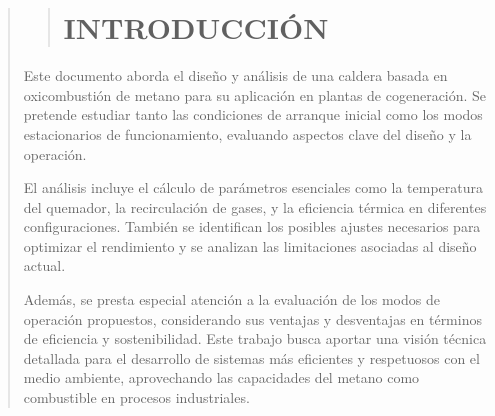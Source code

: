 \documentclass[11pt, a4paper]{article}
\begin{document}
\begin{quote}
\begin{center}
\begin{adjustwidth}{-1.7cm}{-1cm}
\newpage
\tableofcontents


\newpage
\vspace*{0.05cm}
\listoffigures


\newpage
\vspace*{0.05cm}
\listoftables

\newpage

\begin{quote}
\setlength{\parskip}{1pt} %
\vspace*{0.3cm} %
\hypertarget{introducciuxf3n}{%
\section{INTRODUCCIÓN}\label{introducciuxf3n}}
\end{quote}
\vspace*{1cm} %


Este documento aborda el diseño y análisis de una caldera basada en oxicombustión de metano para su aplicación en plantas de cogeneración. Se pretende estudiar tanto las condiciones de arranque inicial como los modos estacionarios de funcionamiento, evaluando aspectos clave del diseño y la operación.

El análisis incluye el cálculo de parámetros esenciales como la temperatura del quemador, la recirculación de gases, y la eficiencia térmica en diferentes configuraciones. También se identifican los posibles ajustes necesarios para optimizar el rendimiento y se analizan las limitaciones asociadas al diseño actual.

Además, se presta especial atención a la evaluación de los modos de operación propuestos, considerando sus ventajas y desventajas en términos de eficiencia y sostenibilidad. Este trabajo busca aportar una visión técnica detallada para el desarrollo de sistemas más eficientes y respetuosos con el medio ambiente, aprovechando las capacidades del metano como combustible en procesos industriales.


\vspace*{1cm}


\end{adjustwidth}
\end{center}
\end{quote}
\end{document}
